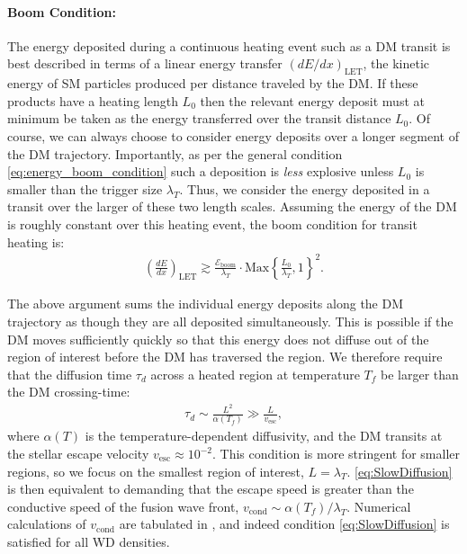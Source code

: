 \documentclass[twocolumn, preprintnumbers,amsmath,amssymb,prd, superscriptaddress]{revtex4}
\newcommand{\Eboom}{\mathcal{E}_\text{boom}}
\begin{document}
\paragraph{Boom Condition:}
The energy deposited during a continuous heating event such as a DM transit is best described in terms of a linear energy transfer $(dE/dx)_\text{LET}$, the kinetic energy of SM particles produced per distance traveled by the DM.
If these products have a heating length $L_0$ then the relevant energy deposit must at minimum be taken as the energy transferred over the transit distance $L_0$.
Of course, we can always choose to consider energy deposits over a longer segment of the DM trajectory.
Importantly, as per the general condition \eqref{eq:energy_boom_condition} such a deposition is \emph{less} explosive unless $L_0$ is smaller than the trigger size $\lambda_T$.
Thus, we consider the energy deposited in a transit over the larger of these two length scales.    
Assuming the energy of the DM is roughly constant over this heating event, the boom condition for transit heating is:
\begin{align}
\label{eq:transitexplosion}
  \left( \frac{d E}{d x} \right)_\text{LET} \gtrsim
  \frac{\Eboom}{\lambda_T} \cdot \text{Max}
  \left\{\frac{L_0}{\lambda_T}, 1 \right\}^2.
\end{align}

The above argument sums the individual energy deposits along the DM trajectory as though they are all deposited simultaneously.
This is possible if the DM moves sufficiently quickly so that this energy does not diffuse out of the region of interest before the DM has traversed the region.
We therefore require that the diffusion time $\tau_d$ across a heated region at temperature $T_f$ be larger than the DM crossing-time:
\begin{align}
  \tau_d \sim \frac{L^2}{\alpha(T_f)} \gg
  \frac{L}{v_\text{esc}},
\label{eq:SlowDiffusion}
\end{align}
where $\alpha(T)$ is the temperature-dependent diffusivity, and the DM transits at the stellar escape velocity $v_\text{esc} \approx 10^{-2}$.
This condition is more stringent for smaller regions, so we focus on the smallest region of interest, $L = \lambda_T$.
\eqref{eq:SlowDiffusion} is then equivalent to demanding that the escape speed is greater than the conductive speed of the fusion wave front, $v_\text{cond} \sim \alpha(T_f) / \lambda_T$.
Numerical calculations of $v_\text{cond}$ are tabulated in \cite{Woosley}, and indeed condition \eqref{eq:SlowDiffusion} is satisfied for all WD densities.
\end{document}
